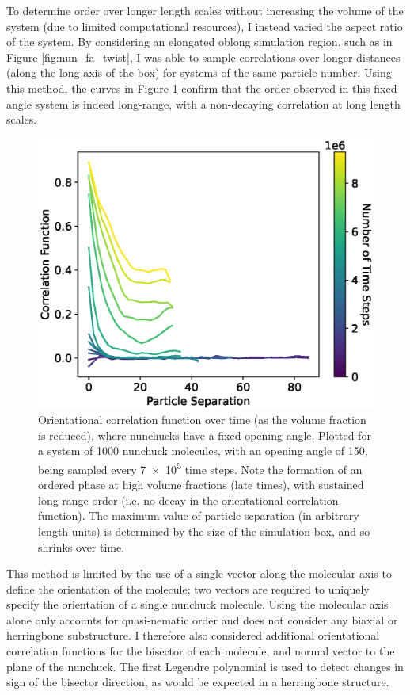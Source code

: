 \documentclass[11pt, a4paper]{article} %
\begin{document}
To determine order over longer length scales without increasing the volume of the system (due to limited computational resources), I instead varied the aspect ratio of the system. By considering an elongated oblong simulation region, such as in Figure \ref{fig:nun_fa_twist}, I was able to sample correlations over longer distances (along the long axis of the box) for systems of the same particle number. Using this method, the curves in Figure \ref{fig:num_fa_correlation_mol} confirm that the order observed in this fixed angle system is indeed long-range, with a non-decaying correlation at long length scales.

\begin{figure} [h!]
	\centering
	\includegraphics[width=0.7\linewidth]{Figures/num_fa_correlation_mol}
	\caption{Orientational correlation function over time (as the volume fraction is reduced), where nunchucks have a fixed opening angle. Plotted for a system of \num{1000} nunchuck molecules, with an opening angle of \SI{150}{\deg}, being sampled every \num{7e5} time steps. Note the formation of an ordered phase at high volume fractions (late times), with sustained long-range order (i.e. no decay in the orientational correlation function). The maximum value of particle separation (in arbitrary length units) is determined by the size of the simulation box, and so shrinks over time.}
	\label{fig:num_fa_correlation_mol}
\end{figure}  %


This method is limited by the use of a single vector along the molecular axis to define the orientation of the molecule; two vectors are required to uniquely specify the orientation of a single nunchuck molecule. Using the molecular axis alone only accounts for quasi-nematic order and does not consider any biaxial or herringbone substructure. I therefore also considered additional orientational correlation functions for the bisector of each molecule, and normal vector to the plane of the nunchuck. The first Legendre polynomial is used to detect changes in sign of the bisector direction, as would be expected in a herringbone structure.
\end{document}
